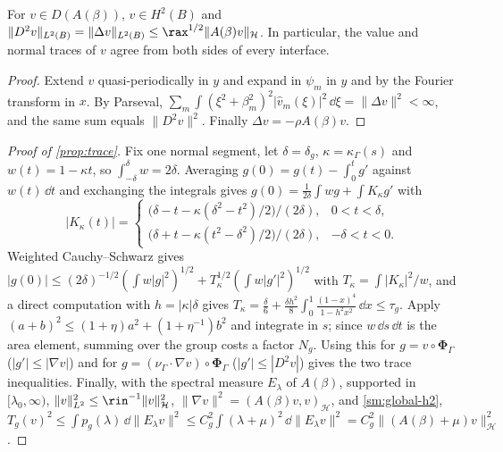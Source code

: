 \begin{lemma}\label{sm:global-h2}
For $v\in D(A(\beta))$, $v\in H^2(B)$ and
$\|D^2v\|_{L^2(B)}=\|\Delta v\|_{L^2(B)}\le\rax^{1/2}\|A(\beta)v\|_{\mathcal H}$. In
particular, the value and normal traces of $v$ agree from both sides of every
interface.
\end{lemma}

\begin{proof}
Extend $v$ quasi-periodically in $y$ and expand in $\psi_m$ in $y$ and by the
Fourier transform in $x$. By Parseval,
$\sum_m\int(\xi^2+\beta_m^2)^2|\widehat v_m(\xi)|^2\,\dd\xi=\|\Delta v\|^2<\infty$, and
the same sum equals $\|D^2v\|^2$. Finally $\Delta v=-\rho A(\beta)v$.
\end{proof}

\begin{proof}[Proof of \cref{prop:trace}]
Fix one normal segment, let $\delta=\delta_g$, $\kappa=\kappa_\Gamma(s)$ and
$w(t)=1-\kappa t$, so $\int_{-\delta}^{\delta}w=2\delta$. Averaging
$g(0)=g(t)-\int_0^tg'$ against $w(t)\,\dd t$ and exchanging the integrals gives
$g(0)=\frac1{2\delta}\int wg+\int K_\kappa g'$ with
\[
  |K_\kappa(t)|=\begin{cases}
  \bigl(\delta-t-\kappa(\delta^2-t^2)/2\bigr)/(2\delta),&0<t<\delta,\\
  \bigl(\delta+t-\kappa(t^2-\delta^2)/2\bigr)/(2\delta),&-\delta<t<0.
  \end{cases}
\]
Weighted Cauchy--Schwarz gives $|g(0)|\le(2\delta)^{-1/2}(\int w|g|^2)^{1/2}
+T_\kappa^{1/2}(\int w|g'|^2)^{1/2}$ with $T_\kappa=\int|K_\kappa|^2/w$, and a direct
computation with $h=|\kappa|\delta$ gives
$T_\kappa=\frac\delta6+\frac{\delta h^2}8\int_0^1\frac{(1-x)^4}{1-h^2x^2}\,\dd x\le\tau_g$.
Apply $(a+b)^2\le(1+\eta)a^2+(1+\eta^{-1})b^2$ and integrate in $s$; since
$w\,\dd s\,\dd t$ is the area element, summing over the group costs a factor $N_g$.
Using this for $g=v\circ\boldsymbol\Phi_\Gamma$ ($|g'|\le|\nabla v|$) and for
$g=(\nu_\Gamma\cdot\nabla v)\circ\boldsymbol\Phi_\Gamma$ ($|g'|\le|D^2v|$) gives the
two trace inequalities. Finally, with the spectral measure $E_\lambda$ of
$A(\beta)$, supported in $[\lambda_0,\infty)$, $\|v\|^2_{L^2}\le\rin^{-1}\|v\|^2_{\mathcal H}$,
$\|\nabla v\|^2=(A(\beta)v,v)_{\mathcal H}$, and \cref{sm:global-h2},
$T_g(v)^2\le\int p_g(\lambda)\,\dd\|E_\lambda v\|^2\le C_g^2\int(\lambda+\mu)^2\,
\dd\|E_\lambda v\|^2=C_g^2\|(A(\beta)+\mu)v\|^2_{\mathcal H}$.
\end{proof}
